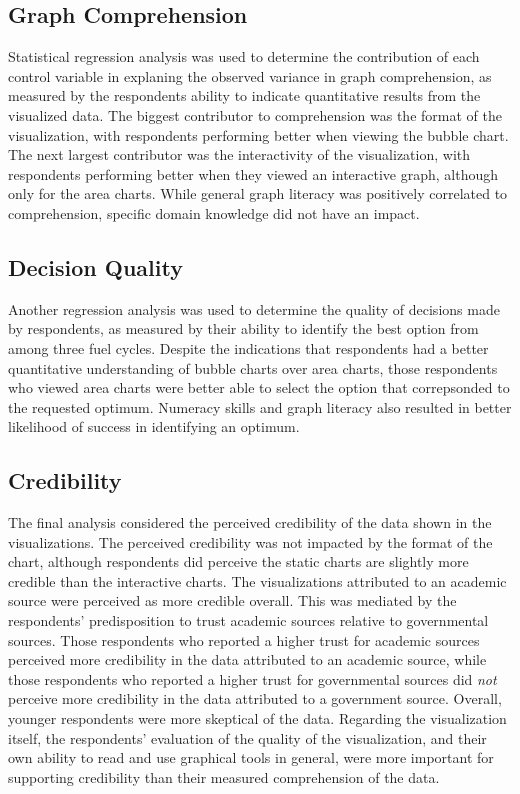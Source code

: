 \subsection{Graph Comprehension}

Statistical regression analysis was used to determine the contribution of each
control variable in explaning the observed variance in graph comprehension, as
measured by the respondents ability to indicate quantitative results from the
visualized data.  The biggest contributor to comprehension was the format of
the visualization, with respondents performing better when viewing the bubble
chart.  The next largest contributor was the interactivity of the
visualization, with respondents performing better when they viewed an
interactive graph, although only for the area charts.  While general graph
literacy was positively correlated to comprehension, specific domain knowledge
did not have an impact.

\subsection{Decision Quality}

Another regression analysis was used to determine the quality of decisions
made by respondents, as measured by their ability to identify the best option
from among three fuel cycles.  Despite the indications that respondents had a
better quantitative understanding of bubble charts over area charts, those
respondents who viewed area charts were better able to select the option that
correpsonded to the requested optimum.  Numeracy skills and graph literacy
also resulted in better likelihood of success in identifying an optimum.

\subsection{Credibility}

The final analysis considered the perceived credibility of the data shown in
the visualizations.  The perceived credibility was not impacted by the format
of the chart, although respondents did perceive the static charts are slightly
more credible than the interactive charts.  The visualizations attributed to
an academic source were perceived as more credible overall.  This was mediated
by the respondents' predisposition to trust academic sources relative to
governmental sources.  Those respondents who reported a higher trust for
academic sources perceived more credibility in the data attributed to an
academic source, while those respondents who reported a higher trust for
governmental sources did \emph{not} perceive more credibility in the data
attributed to a government source.  Overall, younger respondents were more
skeptical of the data.  Regarding the visualization itself, the respondents'
evaluation of the quality of the visualization, and their own ability to read
and use graphical tools in general, were more important for supporting
credibility than their measured comprehension of the data.


